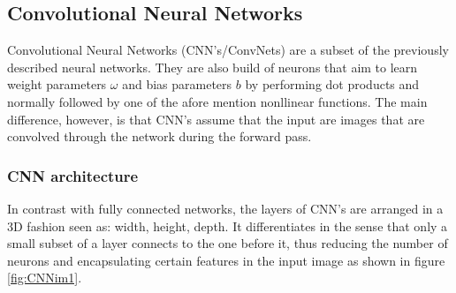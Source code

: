 \subsection{Convolutional Neural Networks}
Convolutional Neural Networks (CNN's/ConvNets) are a subset of the previously described neural networks. They are also build of neurons that aim to learn weight parameters $\omega$ and bias parameters $b$ by performing dot products and normally followed by one of the afore mention nonllinear functions. The main difference, however, is that CNN's assume that the input are images that are convolved through the network during the forward pass.  

\subsubsection{CNN architecture}
In contrast with fully connected networks, the layers of CNN's are arranged in a 3D fashion seen as: width, height, depth. It differentiates in the sense that only a small subset of a layer connects to the one before it, thus reducing the number of neurons and encapsulating certain features in the input image as shown in  figure \ref{fig:CNNim1}. \

